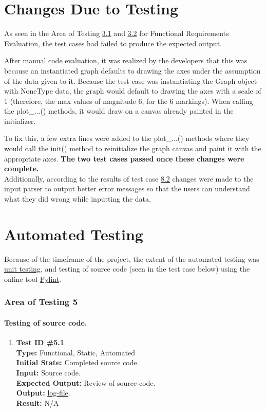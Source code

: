 \documentclass[12pt, titlepage]{article}
\begin{document}
\section{Changes Due to Testing}

As seen in the Area of Testing \hyperref[sec:3.1]{3.1} and \hyperref[sec:3.2]{3.2} for Functional Requirements Evaluation, the test cases had failed to produce the expected output. 

After manual code evaluation, it was realized by the developers that this was because an instantiated graph defaults to drawing the axes under the assumption of the data given to it. Because the test case was instantiating the Graph object with NoneType data, the graph would default to drawing the axes with a scale of 1 (therefore, the max values of magnitude 6, for the 6 markings). When calling the plot\_...() methods, it would draw on a canvas already painted in the initializer. 

To fix this, a few extra lines were added to the plot\_...() methods where they would call the init() method to reinitialize the graph canvas and paint it with the appropriate axes. 
\textbf{The two test cases passed once these changes were complete.}  \\

Additionally, according to the results of test case \hyperref[sec:8.2]{8.2} changes were made to the input parser to output better error messages so that the users can understand what they did wrong while inputting the data.
\section{Automated Testing}
Because of the timeframe of the project, the extent of the automated testing was \hyperref[sec:unittest]{unit testing}, and testing of source code (seen in the test case below) using the online tool \href{https://www.pylint.org}{Pylint}.



\subsubsection{Area of Testing 5}		
	\paragraph{Testing of source code.}
		\begin{enumerate}
			\item{\textbf{Test ID \#5.1\\}}
			\textbf{Type:} Functional, Static, Automated\\
			\textbf{Initial State:} Completed source code. \\
			\textbf{Input:} Source code.\\
			\textbf{Expected Output:} Review of source code.\\
			\textbf{Output:}	 \href{run:code_eval.txt} {\underline{log-file}}.\\
			\textbf{Result:} N/A
		\end{enumerate}
\end{document}

